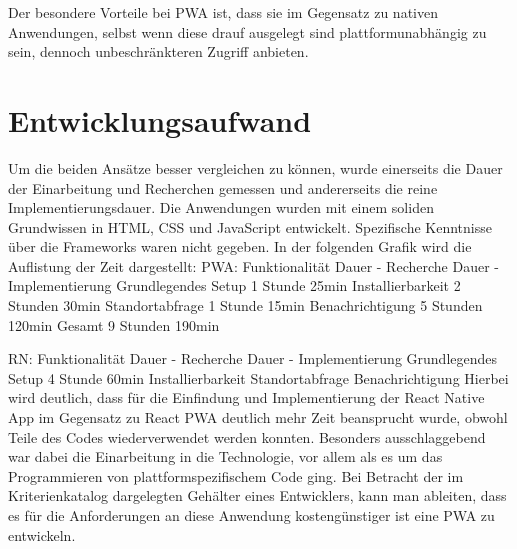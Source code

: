 Der besondere Vorteile bei PWA ist, dass sie im Gegensatz zu nativen Anwendungen, selbst wenn diese drauf ausgelegt sind plattformunabhängig zu sein, dennoch unbeschränkteren Zugriff anbieten.


\section{Entwicklungsaufwand}
Um die beiden Ansätze besser vergleichen zu können, wurde einerseits die Dauer der Einarbeitung und Recherchen gemessen und andererseits die reine Implementierungsdauer. Die Anwendungen wurden mit einem soliden Grundwissen in HTML, CSS und JavaScript entwickelt. Spezifische Kenntnisse über die Frameworks waren nicht gegeben. In der folgenden Grafik wird die Auflistung der Zeit dargestellt:
PWA:
Funktionalität	Dauer - Recherche	Dauer - Implementierung
Grundlegendes Setup	1 Stunde	25min
Installierbarkeit	2 Stunden	30min
Standortabfrage	1 Stunde	15min
Benachrichtigung	5 Stunden	120min
Gesamt	9 Stunden	190min 

RN: 
Funktionalität	Dauer - Recherche	Dauer - Implementierung
Grundlegendes Setup	4 Stunde	60min
Installierbarkeit		
Standortabfrage		
Benachrichtigung
Hierbei wird deutlich, dass für die Einfindung und Implementierung der React Native App im Gegensatz zu React PWA deutlich mehr Zeit beansprucht wurde, obwohl Teile des Codes wiederverwendet werden konnten. Besonders ausschlaggebend war dabei die Einarbeitung in die Technologie, vor allem als es um das Programmieren von plattformspezifischem Code ging. Bei Betracht der im Kriterienkatalog dargelegten Gehälter eines Entwicklers, kann man ableiten, dass es für die Anforderungen an diese Anwendung kostengünstiger ist eine PWA zu entwickeln.


